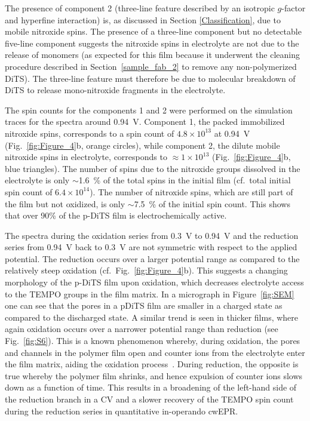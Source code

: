 \par
The presence of component 2 (three-line feature described by an isotropic $g$-factor and hyperfine interaction) is, as discussed in Section \ref{Classification}, due to mobile nitroxide spins. The presence of a three-line component but no detectable five-line component suggests the nitroxide spins in electrolyte are not due to the release of monomers (as expected for this film because it underwent the cleaning procedure described in Section~\ref{sample_fab_2} to remove any non-polymerized DiTS). The three-line feature must therefore be due to molecular breakdown of DiTS to release mono-nitroxide fragments in the electrolyte.

\par
The spin counts for the components 1 and 2 were performed on the simulation traces for the spectra around 0.94~V. Component 1, the packed immobilized nitroxide spins, corresponds to a spin count of $4.8\times10^{13}$ at 0.94~V (Fig.~\ref{fig:Figure_4}b, orange circles), while component 2, the dilute mobile nitroxide spins in electrolyte, corresponds to $\approx 1\times10^{13}$ (Fig.~\ref{fig:Figure_4}b, blue triangles). The number of spins due to the nitroxide groups dissolved in the electrolyte is only $\sim$1.6~\% of the total spins in the initial film (cf.\ total initial spin count of $6.4\times10^{14}$). The number of nitroxide spins, which are still part of the film but not oxidized, is only $\sim$7.5~\% of the initial spin count. This shows that over 90\% of the p-DiTS film is electrochemically active.

\par
The spectra during the oxidation series from 0.3~V to 0.94~V and the reduction series from 0.94~V back to 0.3~V are not symmetric with respect to the applied potential. The reduction occurs over a larger potential range as compared to the relatively steep oxidation (cf.\ Fig.~\ref{fig:Figure_4}b). This suggests a changing morphology of the p-DiTS film upon oxidation, which decreases electrolyte access to the TEMPO groups in the film matrix. In a micrograph in Figure~\ref{fig:SEM} one can see that the pores in a pDiTS film are smaller in a charged state as compared to the discharged state. A similar trend is seen in thicker films, where again oxidation occurs over a narrower potential range than reduction (see Fig.~\ref{fig:S6}). This is a known phenomenon whereby, during oxidation, the pores and channels in the polymer film open and counter ions from the electrolyte enter the film matrix, aiding the oxidation process~\cite{Vereshchagin2020}. During reduction, the opposite is true whereby the polymer film shrinks, and hence expulsion of counter ions slows down as a function of time. This results in a broadening of the left-hand side of the reduction branch in a CV and a slower recovery of the TEMPO spin count during the reduction series in quantitative in-operando cwEPR. 

